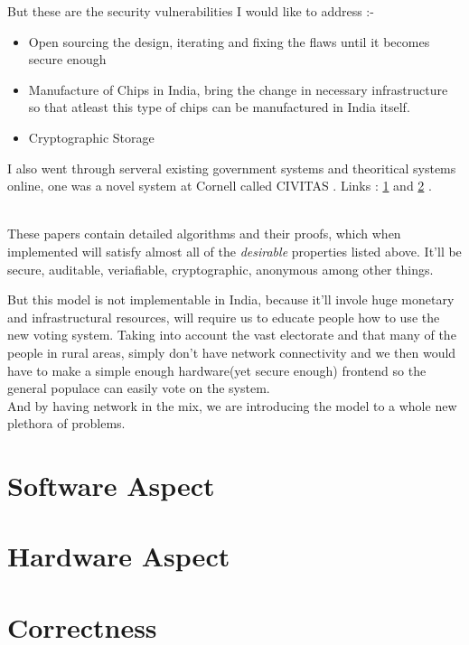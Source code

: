 \documentclass[12pt]{report}
\begin{document}
\label{sec:addr}
But these are the security vulnerabilities I would like to address :- 
\begin{itemize}
  \item Open sourcing the design, iterating and fixing the flaws until it becomes secure enough
  \item Manufacture of Chips in India, bring the change in necessary infrastructure so that atleast this type of chips can be manufactured in India itself.
  \item Cryptographic Storage
\end{itemize}

I also went through serveral existing government systems and theoritical systems online, one was a novel system at Cornell called CIVITAS . Links : \href{https://www.cs.cornell.edu/projects/civitas/papers/clarkson_civitas.pdf}{1} and \href{https://www.cs.cornell.edu/~clarkson/papers/clarkson_civitas_tr.pdf}{2} .

\vspace{0.5cm}

\\
These papers contain detailed algorithms and their proofs, which when implemented will satisfy almost all of the \textit{desirable} properties listed above. It'll be secure, auditable, veriafiable, cryptographic, anonymous among other things.
\\

\vspace{0.5cm}

But this model is not implementable in India, because it'll invole huge monetary and infrastructural resources, will require us to educate people how to use the new voting system. Taking into account the vast electorate and that many of the people in rural areas, simply don't have network connectivity and we then would have to make a simple enough hardware(yet secure enough) frontend so the general populace can easily vote on the system. 
\\
And by having network in the mix, we are introducing the model to a whole new plethora of problems.

\section{Software Aspect}
\section{Hardware Aspect}
\section{Correctness}
\end{document}
